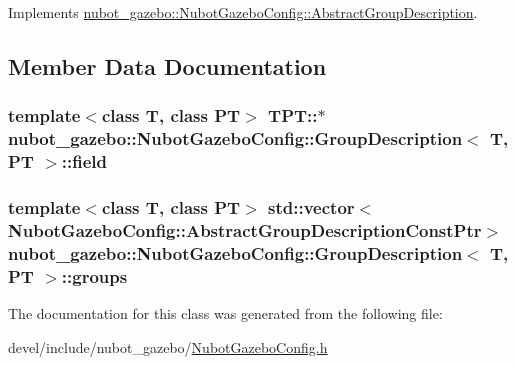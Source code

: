 Implements \hyperlink{classnubot__gazebo_1_1NubotGazeboConfig_1_1AbstractGroupDescription_ae29f54cac4aa3f6509e4363926be3e58}{nubot\-\_\-gazebo\-::\-Nubot\-Gazebo\-Config\-::\-Abstract\-Group\-Description}.



\subsection{Member Data Documentation}
\hypertarget{classnubot__gazebo_1_1NubotGazeboConfig_1_1GroupDescription_ad92a5d0dbf941d71437800f2ad833109}{
\subsubsection[{field}]{\setlength{\rightskip}{0pt plus 5cm}template$<$class T, class P\-T$>$ T\-P\-T\-::$\ast$ {\bf nubot\-\_\-gazebo\-::\-Nubot\-Gazebo\-Config\-::\-Group\-Description}$<$ T, P\-T $>$\-::field}}\label{classnubot__gazebo_1_1NubotGazeboConfig_1_1GroupDescription_ad92a5d0dbf941d71437800f2ad833109}
\hypertarget{classnubot__gazebo_1_1NubotGazeboConfig_1_1GroupDescription_a23ef3b68aea4d4672ff50ea6e8b16708}{
\subsubsection[{groups}]{\setlength{\rightskip}{0pt plus 5cm}template$<$class T, class P\-T$>$ std\-::vector$<${\bf Nubot\-Gazebo\-Config\-::\-Abstract\-Group\-Description\-Const\-Ptr}$>$ {\bf nubot\-\_\-gazebo\-::\-Nubot\-Gazebo\-Config\-::\-Group\-Description}$<$ T, P\-T $>$\-::groups}}\label{classnubot__gazebo_1_1NubotGazeboConfig_1_1GroupDescription_a23ef3b68aea4d4672ff50ea6e8b16708}


The documentation for this class was generated from the following file\-:\begin{DoxyCompactItemize}
\item 
devel/include/nubot\-\_\-gazebo/\hyperlink{NubotGazeboConfig_8h}{Nubot\-Gazebo\-Config.\-h}\end{DoxyCompactItemize}
